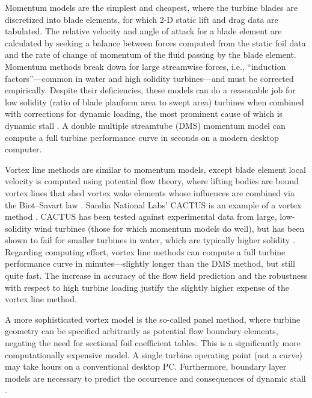 Momentum models are the simplest and cheapest, where the turbine blades are
discretized into blade elements, for which 2-D static lift and drag data are
tabulated. The relative velocity and angle of attack for a blade element are
calculated by seeking a balance between forces computed from the static foil
data and the rate of change of momentum of the fluid passing by the blade
element. Momentum methods break down for large streamwise forces, i.e.,
``induction factors''---common in water and high solidity turbines---and must be
corrected empirically. Despite their deficiencies, these models can do a
reasonable job for low solidity (ratio of blade planform area to swept area)
turbines when combined with corrections for dynamic loading, the most prominent
cause of which is dynamic stall \cite{Para2002}. A double multiple streamtube
(DMS) momentum model can compute a full turbine performance curve in seconds on
a modern desktop computer.

Vortex line methods are similar to momentum models, except blade element local
velocity is computed using potential flow theory, where lifting bodies are bound
vortex lines that shed vortex wake elements whose influences are combined via
the Biot--Savart law \cite{Strickland1979}. Sandia National Labs' CACTUS is an
example of a vortex method \cite{Murray2011}. CACTUS has been tested against
experimental data from large, low-solidity wind turbines (those for which
momentum models do well), but has been shown to fail for smaller turbines in
water, which are typically higher solidity \cite{Michelen2014}. Regarding
computing effort, vortex line methods can compute a full turbine performance
curve in minutes---slightly longer than the DMS method, but still quite fast.
The increase in accuracy of the flow field prediction and the robustness with
respect to high turbine loading justify the slightly higher expense of the
vortex line method.

A more sophisticated vortex model is the so-called panel method, where turbine
geometry can be specified arbitrarily as potential flow boundary elements,
negating the need for sectional foil coefficient tables. This is a significantly
more computationally expensive model. A single turbine operating point (not a
curve) may take hours on a conventional desktop PC. Furthermore, boundary layer
models are necessary to predict the occurrence and consequences of dynamic
stall \cite{Zanon2012}.


